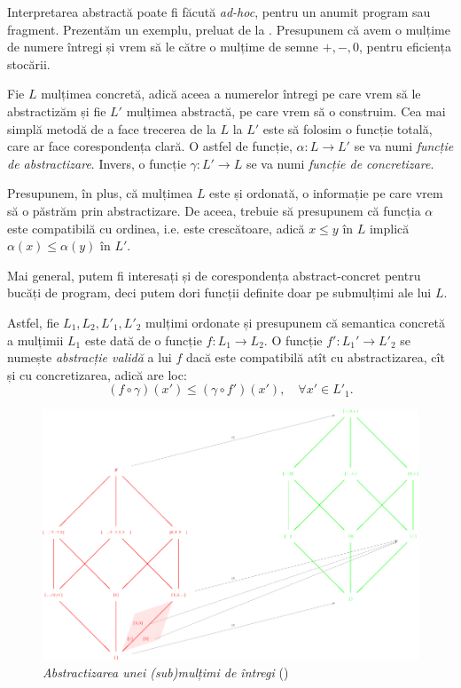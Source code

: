 Interpretarea abstractă poate fi făcută \emph{ad-hoc}, pentru un anumit program
sau fragment. Prezentăm un exemplu, preluat de la \cite{wikiabs}. Presupunem că
avem o mulțime de numere întregi și vrem să le  către o mulțime
de semne $ +, -, 0 $, pentru eficiența stocării.

Fie $ L $ mulțimea concretă, adică aceea a numerelor întregi pe care vrem să le
abstractizăm și fie $ L' $ mulțimea abstractă, pe care vrem să o construim.
Cea mai simplă metodă de a face trecerea de la $ L $ la $ L' $ este să folosim
o funcție totală, care ar face corespondența clară. O astfel de funcție,
$ \alpha : L \to L' $ se va numi \emph{funcție de abstractizare}. Invers, o funcție
$ \gamma : L' \to L $ se va numi \emph{funcție de concretizare}.

Presupunem, în plus, că mulțimea $ L $ este și ordonată, o informație pe
care vrem să o păstrăm prin abstractizare. De aceea, trebuie să presupunem că
funcția $ \alpha $ este compatibilă cu ordinea, i.e. este crescătoare, adică
$ x \leq y $ în $ L $ implică $ \alpha(x) \leq \alpha(y) $ în $ L' $.

Mai general, putem fi interesați și de corespondența abstract-concret pentru bucăți
de program, deci putem dori funcții definite doar pe submulțimi ale lui $ L $.

Astfel, fie $ L_1, L_2, L'_1, L'_2 $ mulțimi ordonate și presupunem că semantica
concretă a mulțimii $ L_1 $ este dată de o funcție $ f : L_1 \to L_2 $. O funcție
$ f' : L_1' \to L'_2 $ se numește \emph{abstracție validă} a lui $ f $ dacă
este compatibilă atît cu abstractizarea, cît și cu concretizarea, adică are loc:
\[
  (f \circ \gamma)(x') \leq (\gamma \circ f')(x'), \quad \forall x' \in L'_1.
\]

\begin{figure}[!htbp]
  \centering
    \includegraphics[width=1\textwidth]{img/abs}
    \caption{\textit{Abstractizarea unei (sub)mulțimi de întregi} (\cite{wikiabs})}
\end{figure}

